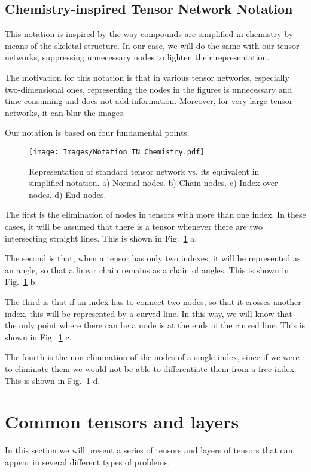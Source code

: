 \newpage

\subsection{Chemistry-inspired Tensor Network Notation}
This notation is inspired by the way compounds are simplified in chemistry by means of the skeletal structure. In our case, we will do the same with our tensor networks, suppressing unnecessary nodes to lighten their representation.

The motivation for this notation is that in various tensor networks, especially two-dimensional ones, representing the nodes in the figures is unnecessary and time-consuming and does not add information. Moreover, for very large tensor networks, it can blur the images.

Our notation is based on four fundamental points.
\begin{figure}[h]
    \centering
    \texttt{[image: Images/Notation\_TN\_Chemistry.pdf]}
    \caption{Representation of standard tensor network vs. its equivalent in simplified notation. a) Normal nodes. b) Chain nodes. c) Index over nodes. d) End nodes.}
    \label{fig: Notation TN}
\end{figure}

The first is the elimination of nodes in tensors with more than one index. In these cases, it will be assumed that there is a tensor whenever there are two intersecting straight lines. This is shown in Fig.~\ref{fig: Notation TN} a. 

The second is that, when a tensor has only two indexes, it will be represented as an angle, so that a linear chain remains as a chain of angles. This is shown in Fig.~\ref{fig: Notation TN} b.

The third is that if an index has to connect two nodes, so that it crosses another index, this will be represented by a curved line. In this way, we will know that the only point where there can be a node is at the ends of the curved line. This is shown in Fig.~\ref{fig: Notation TN} c.

The fourth is the non-elimination of the nodes of a single index, since if we were to eliminate them we would not be able to differentiate them from a free index. This is shown in Fig.~\ref{fig: Notation TN} d.

\newpage


\section{Common tensors and layers}
In this section we will present a series of tensors and layers of tensors that can appear in several different types of problems.

